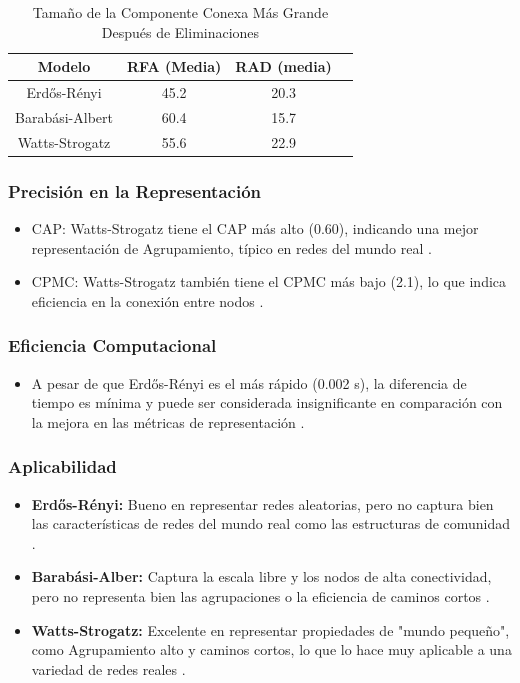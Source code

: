 \begin{table}[h!]
    \centering
    \begin{tabular}{cccc}
    \toprule
    Modelo & RFA (Media) & RAD (media)  \\
    \midrule
    Erdős-Rényi & 45.2 & 20.3 \\
    Barabási-Albert & 60.4 & 15.7 \\
    Watts-Strogatz & 55.6 & 22.9 \\
    \bottomrule
    \end{tabular}
    \caption{Tamaño de la Componente Conexa Más Grande \\Después de Eliminaciones}
\end{table}

\subsubsection{Precisión en la Representación}
\begin{itemize}
    \item CAP: Watts-Strogatz tiene el CAP más alto (0.60), indicando una mejor representación de Agrupamiento, típico en redes del mundo real .
    \item CPMC: Watts-Strogatz también tiene el CPMC más bajo (2.1), lo que indica eficiencia en la conexión entre nodos .
\end{itemize}
\subsubsection{Eficiencia Computacional}

\begin{itemize}
    \item A pesar de que Erdős-Rényi es el más rápido (0.002 s), la diferencia de tiempo es mínima y puede ser considerada insignificante en comparación con la mejora en las métricas de representación .
\end{itemize}

\subsubsection{Aplicabilidad}

\begin{itemize}
    \item \textbf{Erdős-Rényi:} Bueno en representar redes aleatorias, pero no captura bien las características de redes del mundo real como las estructuras de comunidad .
    \item \textbf{Barabási-Alber:} Captura la escala libre y los nodos de alta conectividad, pero no representa bien las agrupaciones o la eficiencia de caminos cortos .
    \item \textbf{Watts-Strogatz:} Excelente en representar propiedades de "mundo pequeño", como Agrupamiento alto y caminos cortos, lo que lo hace muy aplicable a una variedad de redes reales .
\end{itemize}

